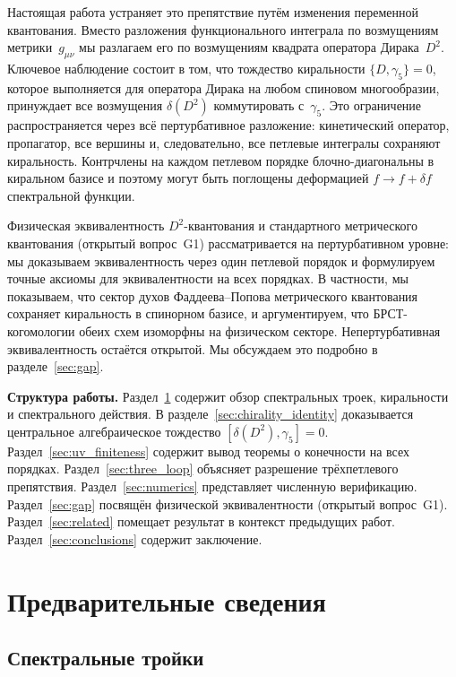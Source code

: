 \documentclass[12pt,a4paper]{article}
\theoremstyle{definition}
\theoremstyle{remark}
\begin{document}
Настоящая работа устраняет это препятствие путём изменения переменной
квантования.  Вместо разложения функционального интеграла по
возмущениям метрики~$g_{\mu\nu}$ мы разлагаем его по возмущениям
квадрата оператора Дирака~$D^2$.  Ключевое наблюдение состоит в том,
что тождество киральности $\{D, \gamma_5\} = 0$, которое выполняется
для оператора Дирака на любом спиновом многообразии, принуждает все
возмущения $\delta(D^2)$ коммутировать с~$\gamma_5$.  Это ограничение
распространяется через всё пертурбативное разложение: кинетический
оператор, пропагатор, все вершины и, следовательно, все петлевые
интегралы сохраняют киральность.  Контрчлены на каждом петлевом порядке
блочно-диагональны в киральном базисе и поэтому могут быть поглощены
деформацией $f \to f + \delta f$ спектральной функции.

Физическая эквивалентность $D^2$-квантования и стандартного метрического
квантования (открытый вопрос~G1) рассматривается на пертурбативном
уровне: мы доказываем эквивалентность через один петлевой порядок и
формулируем точные аксиомы для эквивалентности на всех порядках.  В
частности, мы показываем, что сектор духов Фаддеева--Попова метрического
квантования сохраняет киральность в спинорном базисе, и аргументируем,
что БРСТ-когомологии обеих схем изоморфны на физическом секторе.
Непертурбативная эквивалентность остаётся открытой.  Мы обсуждаем это
подробно в разделе~\ref{sec:gap}.

\medskip
\noindent\textbf{Структура работы.}
Раздел~\ref{sec:prelim} содержит обзор спектральных троек, киральности
и спектрального действия.  В разделе~\ref{sec:chirality_identity}
доказывается центральное алгебраическое тождество
$[\delta(D^2), \gamma_5] = 0$.
Раздел~\ref{sec:uv_finiteness} содержит вывод теоремы о конечности на
всех порядках.  Раздел~\ref{sec:three_loop} объясняет разрешение
трёхпетлевого препятствия.  Раздел~\ref{sec:numerics} представляет
численную верификацию.  Раздел~\ref{sec:gap} посвящён физической
эквивалентности (открытый вопрос~G1).
Раздел~\ref{sec:related} помещает результат в контекст предыдущих
работ.  Раздел~\ref{sec:conclusions} содержит заключение.

\section{Предварительные сведения}
\label{sec:prelim}

\subsection{Спектральные тройки}
\end{document}
